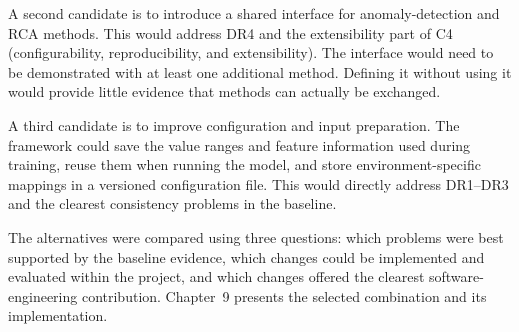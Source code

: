 A second candidate is to introduce a shared interface for anomaly-detection and RCA methods. This would address DR4 and the extensibility part of C4 (configurability, reproducibility, and extensibility). The interface would need to be demonstrated with at least one additional method. Defining it without using it would provide little evidence that methods can actually be exchanged.

A third candidate is to improve configuration and input preparation. The framework could save the value ranges and feature information used during training, reuse them when running the model, and store environment-specific mappings in a versioned configuration file. This would directly address DR1--DR3 and the clearest consistency problems in the baseline.

The alternatives were compared using three questions: which problems were best supported by the baseline evidence, which changes could be implemented and evaluated within the project, and which changes offered the clearest software-engineering contribution. Chapter~9 presents the selected combination and its implementation.


